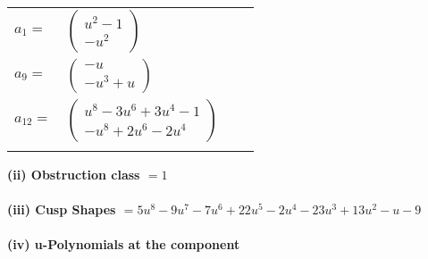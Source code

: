 \documentclass[1p]{elsarticle_modified}
\theoremstyle{definition}
\begin{document}
\begin{tabular}{m{7pt} m{180pt} m{7pt} m{180pt} }
\flushright $a_{1}=$&$\begin{pmatrix}u^2-1\\- u^2\end{pmatrix}$ \\
\flushright $a_{9}=$&$\begin{pmatrix}- u\\- u^3+u\end{pmatrix}$ \\
\flushright $a_{12}=$&$\begin{pmatrix}u^8-3 u^6+3 u^4-1\\- u^8+2 u^6-2 u^4\end{pmatrix}$\\&\end{tabular}
\flushleft \textbf{(ii) Obstruction class $= 1$}\\~\\
\flushleft \textbf{(iii) Cusp Shapes $= 5 u^8-9 u^7-7 u^6+22 u^5-2 u^4-23 u^3+13 u^2- u-9$}\\~\\
\newpage\renewcommand{\arraystretch}{1}
\flushleft \textbf{(iv) u-Polynomials at the component}\newline \\
\end{document}
